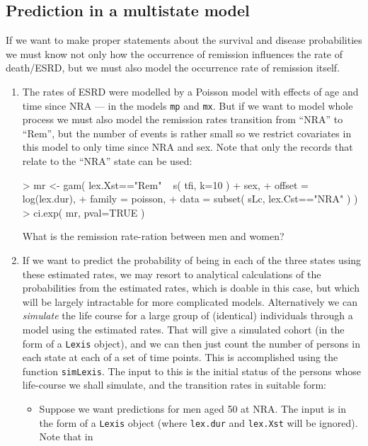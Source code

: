 \subsection{Prediction in a multistate model}
If we want to make proper statements about the survival and disease
probabilities we must know not only how the occurrence of remission
influences the rate of death/ESRD, but we must also model the
occurrence rate of remission itself.
\begin{enumerate}[resume] 
\item The rates of ESRD were modelled by a Poisson model with
  effects of age and time since NRA --- in the models \texttt{mp}
  and \texttt{mx}.  But if we want to model whole process we must
  also model the remission rates transition from ``NRA'' to
  ``Rem'', but the number of events is rather small so we restrict
  covariates in this model to only time since NRA and sex. Note
  that only the records that relate to the ``NRA'' state can be
  used:
\begin{Schunk}
\begin{Sinput}
> mr <- gam( lex.Xst=="Rem" ~ s( tfi, k=10 ) + sex,
+            offset = log(lex.dur),
+            family = poisson,
+              data = subset( sLc, lex.Cst=="NRA" ) )
> ci.exp( mr, pval=TRUE )
\end{Sinput}
\end{Schunk}
What is the remission rate-ration between men and women?
\item If we want to predict the probability of being in each of the
  three states using these estimated rates, we may resort to
  analytical calculations of the probabilities from the estimated
  rates, which is doable in this case, but which will be largely
  intractable for more complicated models. 
  Alternatively we can \emph{simulate} the life course for a large
  group of (identical) individuals through a model using the estimated
  rates. That will give a simulated cohort (in the form of a
  \texttt{Lexis} object), and we can then just count the number of
  persons in each state at each of a set of time points.
  This is accomplished using the function \texttt{simLexis}. The input
  to this is the initial status of the persons whose life-course we
  shall simulate, and the transition rates in suitable form:
\begin{itemize}
\item Suppose we want predictions for men aged 50 at
  NRA. The input is in the form of a \texttt{Lexis} object (where
  \texttt{lex.dur} and \texttt{lex.Xst} will be ignored). Note that in

\end{itemize}
\end{enumerate}
